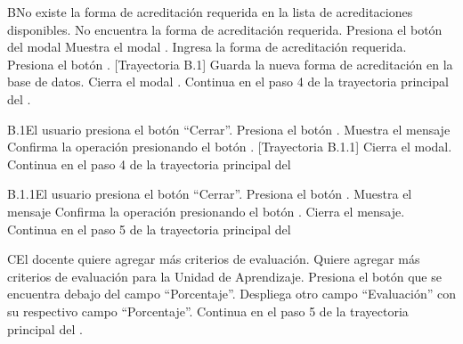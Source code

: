 
\begin{UCtrayectoriaA}{B}{No existe la forma de acreditación requerida en la lista de acreditaciones disponibles.}
    \UCpaso[\UCactor] No encuentra la forma de acreditación requerida.
    \UCpaso[\UCactor] Presiona el botón  del modal 
    \UCpaso Muestra el modal .
    \UCpaso[\UCactor] Ingresa la forma de acreditación requerida.
    \UCpaso[\UCactor] Presiona el botón . [Trayectoria B.1]
    \UCpaso Guarda la nueva forma de acreditación en la base de datos.
    \UCpaso Cierra el modal .
    \UCpaso Continua en el paso 4 de la trayectoria principal del .
\end{UCtrayectoriaA}


\begin{UCtrayectoriaA}{B.1}{El usuario presiona el botón ``Cerrar''.}
    \UCpaso[\UCactor] Presiona el botón .
    \UCpaso Muestra el mensaje 
    \UCpaso[\UCactor] Confirma la operación presionando el botón . [Trayectoria B.1.1]
    \UCpaso Cierra el modal.
    \UCpaso Continua en el paso 4 de la trayectoria principal del 
\end{UCtrayectoriaA}


\begin{UCtrayectoriaA}{B.1.1}{El usuario presiona el botón ``Cerrar''.}
    \UCpaso[\UCactor] Presiona el botón .
    \UCpaso Muestra el mensaje 
    \UCpaso[\UCactor] Confirma la operación presionando el botón .
    \UCpaso Cierra el mensaje.
    \UCpaso Continua en el paso 5 de la trayectoria principal del 
\end{UCtrayectoriaA}



\begin{UCtrayectoriaA}{C}{El docente quiere agregar más criterios de evaluación.}
    \UCpaso[\UCactor] Quiere agregar más criterios de evaluación para la Unidad de Aprendizaje.
    \UCpaso[\UCactor] Presiona el botón  que se encuentra debajo del campo ``Porcentaje''.
    \UCpaso Despliega otro campo ``Evaluación'' con su respectivo campo ``Porcentaje''.
    \UCpaso Continua en el paso 5 de la trayectoria principal del .
\end{UCtrayectoriaA}


